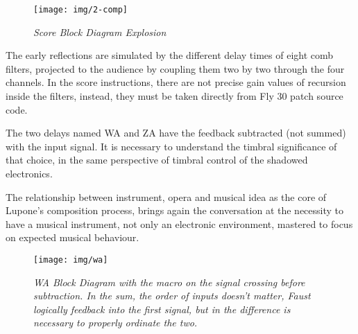 \documentclass[twoside,a4paper]{article}
\begin{document}
\begin{figure}[ht]
\centerline{\texttt{[image: img/2-comp]}}
\caption{\label{ml-dia-exp}{\it Score Block Diagram Explosion}}
\end{figure}

The early reflections are simulated by the different delay times of eight comb
filters, projected to the audience by coupling them two by two through the four
channels. In the score instructions, there are not precise gain values of recursion
inside the filters, instead, they must be taken directly from Fly 30 patch source
code.

The two delays named WA and ZA have the feedback subtracted (not summed) with the
input signal. It is necessary to understand the timbral significance of that
choice, in the same perspective of timbral control of the shadowed electronics.

The relationship between instrument, opera and musical idea as the core of Lupone's
composition process, brings again the conversation at the necessity to have a
musical instrument, not only an electronic environment, mastered to focus on
expected musical behaviour.



\begin{figure}[ht]
\centerline{\texttt{[image: img/wa]}}
\caption{\label{wa-block}{\it WA Block Diagram with the macro on the signal
crossing before subtraction. In the sum, the order of inputs doesn't matter,
\emph{Faust} logically feedback into the first signal, but in the difference is
necessary to properly ordinate the two.}}
\end{figure}

\end{document}
